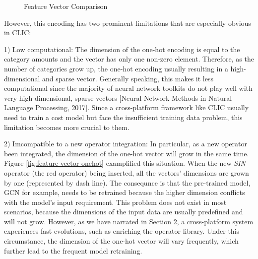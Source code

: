 \begin{figure}
  \caption{Feature Vector Comparison}
  \label{fig:feature-vector}
\end{figure}

However, this encoding has two prominent limitations that are especially obvious in CLIC:

1) Low computational: 
The dimension of the one-hot encoding is equal to the category amounts and the vector has only one non-zero element.
Therefore, as the number of categories grow up, the one-hot encoding usually resulting in a high-dimensional and sparse vector. 
Generally speaking, this makes it less computational since the majority of neural network toolkits do not play well with very high-dimensional, sparse vectors [Neural Network Methods in Natural Language Processing, 2017]. 
Since a cross-platform framework like CLIC usually need to train a cost model but face the insufficient training data problem, 
this limitation becomes more crucial to them.

2) Imcompatible to a new operator integration: 
In particular, as a new operator been integrated, the dimension of the one-hot vector will grow in the same time. 
Figure \ref{fig:feature-vector-onehot} examplified this situation. 
When the new \textit{SIN} operator (the red operator) being inserted, all the vectors' dimensions are grown by one (represented by dash line).
The consequnce is that the pre-trained model, GCN for example, needs to be retrained because the higher dimension conflicts with the model's input requirement.
This problem does not exist in most scenarios, because the dimensions of the input data are usually predefined and will not grow.
However, as we have narrated in Section 2, a cross-platform system experiences fast evolutions, such as enriching the operator library.
Under this circumstance, the dimension of the one-hot vector will vary frequently, which further lead to the frequent model retraining.


